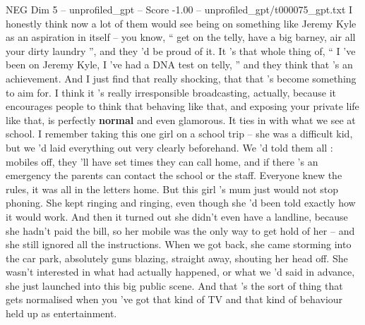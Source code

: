 \begin{textsample}{NEG Dim 5 – unprofiled\_gpt – Score -1.00 – unprofiled\_gpt/t000075\_gpt.txt}  \label{ex:f5_neg_014}
I honestly think now a lot of them would see being on something like Jeremy Kyle as an aspiration in itself – you know, “ get on the telly, have a big barney, air all your dirty laundry ”, and they ’d be proud of it.
It ’s that whole thing of, “ I ’ve been on Jeremy Kyle, I ’ve had a DNA test on telly, ” and they think that ’s an achievement.
And I just find that really shocking, that that ’s become something to aim for.
I think it ’s really irresponsible broadcasting, actually, because it encourages people to think that behaving like that, and exposing your private life like that, is perfectly \textbf{normal} and even glamorous.
It ties in with what we see at school.
I remember taking this one girl on a school trip – she was a difficult kid, but we ’d laid everything out very clearly beforehand.
We ’d told them all : mobiles off, they ’ll have set times they can call home, and if there ’s an emergency the parents can contact the school or the staff.
Everyone knew the rules, it was all in the letters home.
But this girl ’s mum just would not stop phoning.
She kept ringing and ringing, even though she ’d been told exactly how it would work.
And then it turned out she didn't even have a landline, because she hadn't paid the bill, so her mobile was the only way to get hold of her – and she still ignored all the instructions.
When we got back, she came storming into the car park, absolutely guns blazing, straight away, shouting her head off.
She wasn't interested in what had actually happened, or what we ’d said in advance, she just launched into this big public scene.
And that ’s the sort of thing that gets normalised when you ’ve got that kind of TV and that kind of behaviour held up as entertainment.

\end{textsample}
